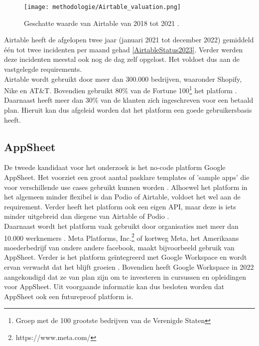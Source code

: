 \begin{figure}[h]
    \centering
    \texttt{[image: methodologie/Airtable\_valuation.png]}
    \caption[Geschatte waarde van Airtable]{Geschatte waarde van Airtable van 2018 tot 2021 \autocite{Khemchandani2023}.}
    \label{fig:airtable_value}
\end{figure}

Airtable heeft de afgelopen twee jaar (januari 2021 tot december 2022) gemiddeld één tot twee incidenten per maand gehad \autoref{AirtableStatus2023}. Verder werden deze incidenten meestal ook nog de dag zelf opgelost. Het voldoet dus aan de vastgelegde requirements. \\

Airtable wordt gebruikt door meer dan 300.000 bedrijven, waaronder Shopify, Nike en AT\&T. Bovendien gebruikt 80\% van de Fortune 100\footnote{Groep met de 100 grootste bedrijven van de Verenigde Staten} het platform \autocite{Prokopets2022}. Daarnaast heeft meer dan 30\% van de klanten zich ingeschreven voor een betaald plan. Hieruit kan dus afgeleid worden dat het platform een goede gebruikersbasis heeft. \\


\subsection{AppSheet}

De tweede kandidaat voor het onderzoek is het no-code platform Google AppSheet. Het voorziet een groot aantal pasklare templates of 'sample apps' die voor verschillende use cases gebruikt kunnen worden \autocite{AppSheetTemplates}. Alhoewel het platform in het algemeen minder flexibel is dan Podio of Airtable, voldoet het wel aan de requirement. Verder heeft het platform ook een eigen API, maar deze is iets minder uitgebreid dan diegene van Airtable of Podio \autocite{AppSheetAPI}. \\

Daarnaast wordt het platform vaak gebruikt door organisaties met meer dan 10.000 werknemers \autocite{Enlyft}. Meta Platforms, Inc.\footnote{https://www.meta.com/} of kortweg Meta, het Amerikaans moederbedrijf van ondere andere facebook, maakt bijvoorbeeld gebruik van AppSheet. Verder is het platform geïntegreerd met Google Workspace en wordt ervan verwacht dat het blijft groeien \autocite{Anand2022}. Bovendien heeft Google Workspace in 2022 aangekondigd dat ze van plan zijn om te investeren in cursussen en opleidingen voor AppSheet. Uit voorgaande informatie kan dus besloten worden dat AppSheet ook een futureproof platform is. \\ 

